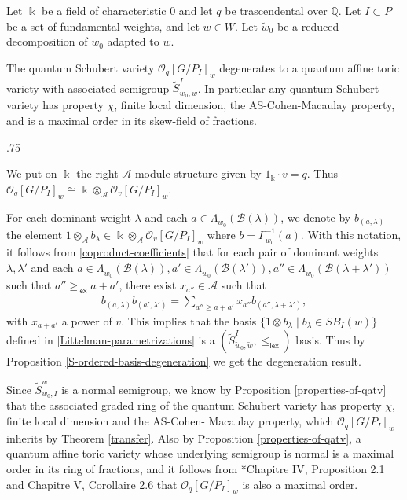 \documentclass[11pt,fleqn]{article}
\makeatletter
\renewenvironment{proof}[1][\textit{Proof}]{\par
  \pushQED{\qed}%
  \normalfont \topsep.75\paraskip\relax
  \trivlist
  \item[\hskip\labelsep
        \itshape
    #1\@addpunct{.}]\ignorespaces
}{%
  \popQED\endtrivlist\@endpefalse
}
\newcommand\QQ{\mathbb Q}
\newcommand\ot{\otimes}
\newcommand\A{\mathcal A}
\newcommand\B{\mathcal B}
\newcommand\GG{\Gamma}
\renewcommand\O{\mathcal O}
\renewcommand\k{\Bbbk}
\newcommand\lex{\mathsf{lex}}
\newcommand\schubertbasis{SB}
\makeatother
\begin{document}
\begin{Theorem}
\label{Schubert-deg}
Let $\k$ be a field of characteristic $0$ and let $q$ be trascendental over 
$\QQ$. Let $I \subset P$ be a set of fundamental weights, and let $w \in W$.
Let $\tilde w_0$ be a reduced decomposition of $w_0$ adapted to $w$.

The quantum Schubert variety $\O_q[G/P_I]_w$ degenerates to a quantum affine 
toric variety with associated semigroup $\tilde S^I_{\tilde w_0, \tilde w}$. 
In particular any quantum Schubert variety has property $\chi$, finite local 
dimension, the AS-Cohen-Macaulay property, and is a maximal order in its 
skew-field of fractions.
\end{Theorem}
\begin{proof}
We put on $\k$ the right $\A$-module structure given by $1_\k \cdot v = q$.
Thus $\O_q[G/P_I]_w \cong \k \ot_\A \O_v[G/P_I]_w$. 

For each dominant weight $\lambda$ and each $a \in \Lambda_{\tilde w_0}
(\B(\lambda))$, we denote by $b_{(a,\lambda)}$ the element $1 \ot_\A b_\lambda
\in \k \ot_\A \O_v[G/P_I]_w$ where $b = \GG_{\tilde w_0}^{-1}(a)$.
With this notation, it follows from \ref{coproduct-coefficients} that for each 
pair of dominant weights $\lambda, \lambda'$ and each $a \in 
\Lambda_{\tilde w_0}(\B(\lambda)), a' \in \Lambda_{\tilde w_0}(\B(\lambda')), 
a'' \in \Lambda_{\tilde w_0}(\B(\lambda + \lambda'))$ such that $a'' 
\geq_{\lex} a + a'$, there exist $x_{a''} \in \A$ such that 
\begin{align*}
b_{(a,\lambda)} b_{(a',\lambda')} = \sum_{a'' \geq a+a'} x_{a''} 
  b_{(a'',\lambda + \lambda')},
\end{align*}
with $x_{a+a'}$ a power of $v$. This implies that the basis 
$\{1 \ot b_\lambda \mid b_\lambda \in \schubertbasis_I(w)\}$ defined in 
\ref{Littelman-parametrizations} is a 
$(\tilde S^I_{\tilde w_0, \tilde w}, \leq_{\lex} )$ basis. Thus by Proposition 
\ref{S-ordered-basis-degeneration} we get the degeneration result.

Since $\tilde S^w_{w_0, I}$ is a normal semigroup, we know by Proposition 
\ref{properties-of-qatv} that the associated graded ring of the quantum 
Schubert variety has property $\chi$, finite local dimension and the AS-Cohen-
Macaulay property, which $\O_q[G/P_I]_w$ inherits by Theorem \ref{transfer}. 
Also by Proposition \ref{properties-of-qatv}, a quantum affine toric variety 
whose underlying semigroup is normal is a maximal order in its ring of 
fractions, and it follows from \cite{Mau}*{Chapitre IV, Proposition 2.1 and 
Chapitre V, Corollaire 2.6} that $\O_q[G/P_I]_w$ is also a maximal order. 
\end{proof}
\end{document}
